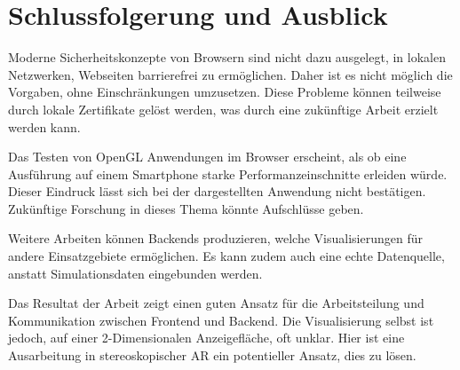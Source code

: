 \section{Schlussfolgerung und Ausblick}

Moderne Sicherheitskonzepte von Browsern sind nicht dazu ausgelegt,
in lokalen Netzwerken, Webseiten barrierefrei zu ermöglichen.
Daher ist es nicht möglich die Vorgaben, ohne Einschränkungen umzusetzen.
Diese Probleme können teilweise durch lokale Zertifikate gelöst werden,
was durch eine zukünftige Arbeit erzielt werden kann.

Das Testen von OpenGL Anwendungen im Browser erscheint, als ob eine
Ausführung auf einem Smartphone starke Performanzeinschnitte erleiden
würde. Dieser Eindruck lässt sich bei der dargestellten Anwendung nicht
bestätigen. Zukünftige Forschung in dieses Thema könnte Aufschlüsse geben.

Weitere Arbeiten können Backends produzieren, welche Visualisierungen
für andere Einsatzgebiete ermöglichen. Es kann zudem auch eine echte
Datenquelle, anstatt Simulationsdaten eingebunden werden.

Das Resultat der Arbeit zeigt einen guten Ansatz für die Arbeitsteilung
und Kommunikation zwischen Frontend und Backend. Die Visualisierung selbst
ist jedoch, auf einer 2-Dimensionalen Anzeigefläche, oft unklar.
Hier ist eine Ausarbeitung in stereoskopischer AR ein potentieller
Ansatz, dies zu lösen.

%	
